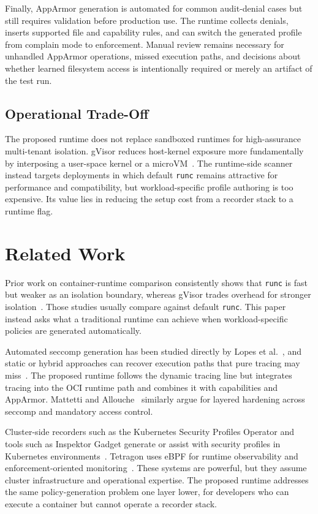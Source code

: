 \documentclass[runningheads]{llncs}
\begin{document}
Finally, AppArmor generation is automated for common audit-denial cases but still requires validation before production use. The runtime collects denials, inserts supported file and capability rules, and can switch the generated profile from complain mode to enforcement. Manual review remains necessary for unhandled AppArmor operations, missed execution paths, and decisions about whether learned filesystem access is intentionally required or merely an artifact of the test run.

\subsection{Operational Trade-Off}

The proposed runtime does not replace sandboxed runtimes for high-assurance multi-tenant isolation. gVisor reduces host-kernel exposure more fundamentally by interposing a user-space kernel or a microVM~\cite{wang2022,viktorsson2020}. The runtime-side scanner instead targets deployments in which default \texttt{runc} remains attractive for performance and compatibility, but workload-specific profile authoring is too expensive. Its value lies in reducing the setup cost from a recorder stack to a runtime flag.

\section{Related Work}\label{sec:related}

Prior work on container-runtime comparison consistently shows that \texttt{runc} is fast but weaker as an isolation boundary, whereas gVisor trades overhead for stronger isolation~\cite{wang2022,volpert2024,viktorsson2020}. Those studies usually compare against default \texttt{runc}. This paper instead asks what a traditional runtime can achieve when workload-specific policies are generated automatically.

Automated seccomp generation has been studied directly by Lopes et al.~\cite{lopes2020}, and static or hybrid approaches can recover execution paths that pure tracing may miss~\cite{canella2021}. The proposed runtime follows the dynamic tracing line but integrates tracing into the OCI runtime path and combines it with capabilities and AppArmor. Mattetti and Allouche~\cite{mattetti2020} similarly argue for layered hardening across seccomp and mandatory access control.

Cluster-side recorders such as the Kubernetes Security Profiles Operator and tools such as Inspektor Gadget generate or assist with security profiles in Kubernetes environments~\cite{spo2025,inspektorgadget2025}. Tetragon uses eBPF for runtime observability and enforcement-oriented monitoring~\cite{tetragon2025}. These systems are powerful, but they assume cluster infrastructure and operational expertise. The proposed runtime addresses the same policy-generation problem one layer lower, for developers who can execute a container but cannot operate a recorder stack.
\end{document}

